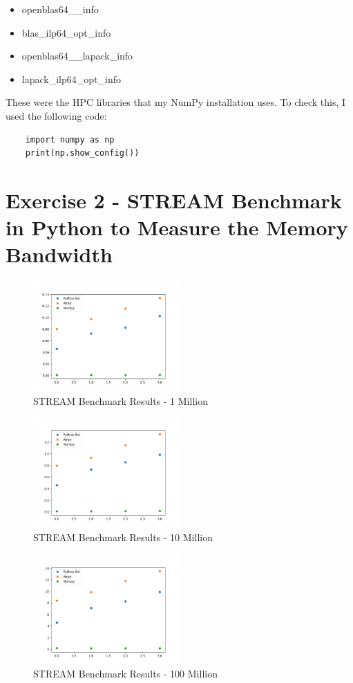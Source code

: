 \documentclass{article}
\begin{document}
\begin{itemize}
    \item openblas64\_\_info
    \item blas\_ilp64\_opt\_info
    \item openblas64\_\_lapack\_info
    \item lapack\_ilp64\_opt\_info
\end{itemize}
These were the HPC libraries that my NumPy installation uses. 
To check this, I used the following code:
\begin{lstlisting}
    import numpy as np
    print(np.show_config())
\end{lstlisting}


\section{Exercise 2 - STREAM Benchmark in Python to Measure the Memory Bandwidth}

\begin{figure}[h]
\centering
\includegraphics[width=0.5\textwidth]{1000000.png}
\caption{STREAM Benchmark Results - 1 Million}
\end{figure}

\begin{figure}[h]
\centering
\includegraphics[width=0.5\textwidth]{10000000.png}
\caption{STREAM Benchmark Results - 10 Million}
\end{figure}

\begin{figure}[h]
\centering
\includegraphics[width=0.5\textwidth]{100000000.png}
\caption{STREAM Benchmark Results - 100 Million}
\end{figure}
\end{document}
